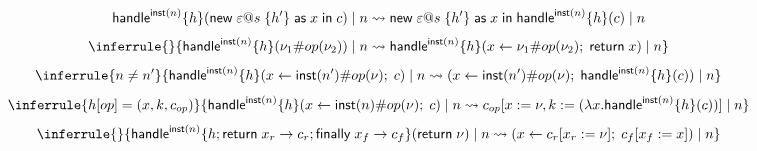{\begin{figure}
{\begin{minipage}{17 cm}
$${}{
	\mathsf{handle}^{\mathsf{inst}(n)} \{ h \} ( \mathsf{new} \; \varepsilon @ s \; \{ h' \} \; \mathsf{as} \; x \;\mathsf{in}\; c ) \;|\; n \rightsquigarrow
	\mathsf{new} \; \varepsilon @ s \; \{ h' \} \; \mathsf{as} \; x \;\mathsf{in}\; \mathsf{handle}^{\mathsf{inst}(n)} \{ h \} ( c ) \;|\; n
}
$$
$$
\inferrule{
}{
	\chandlei{\vinst{n}}{\handler}{\cop{\val_1}{\op}{\val_2}} \;|\; n \rightsquigarrow
	\chandlei{\vinst{n}}{\handler}{\cdo{x}{\cop{\val_1}{\op}{\val_2}}{\creturn{x}}} \;|\; n
}
$$
$$
\inferrule{
	n \neq n'
}{
	\chandlei{\vinst{n}}{\handler}{\cdo{x}{\cop{\vinst{n'}}{\op}{\val}}{\comp}} \;|\; n \rightsquigarrow
	(\cdo{x}{\cop{\vinst{n'}}{\op}{\val}}{\chandlei{\vinst{n}}{\handler}{{\comp}}}) \;|\; n
}
$$
$$
\inferrule{
	\handler[\op] = (x, k, \comp_{\op})
}{
	\chandlei{\vinst{n}}{\handler}{\cdo{x}{\cop{\vinst{n}}{\op}{\val}}{\comp}} \;|\; n \rightsquigarrow
	\comp_{\op}[x := \val, k := (\vabs{x}{\chandlei{\vinst{n}}{\handler}{\comp}})] \;|\; n
}
$$
$$
\inferrule{
}{
	\chandlei{\vinst{n}}{\handler; \hreturn{x_r}{\comp_r}{x_f}{\comp_f}}{\creturn{\val}} \;|\; n \rightsquigarrow
	(\cdo{x}{\comp_r[x_r := \val]}{\comp_f[x_f := x]}) \;|\; n
}
$$
\label{fig:semantics-calc}
\end{minipage}
}
\end{figure}

}